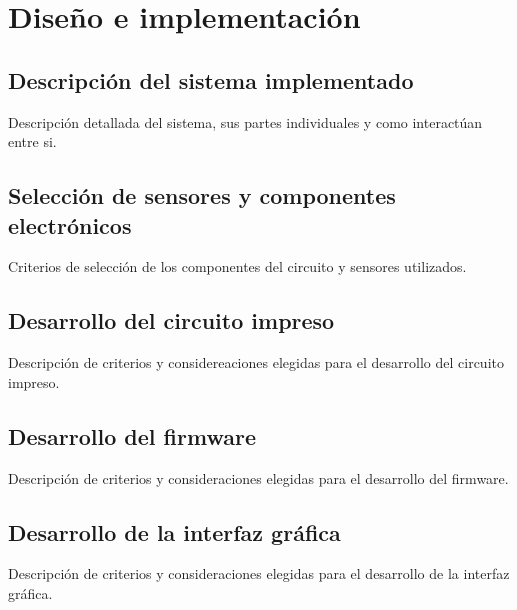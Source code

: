 \chapter{Diseño e implementación} %

\label{Chapter3}
\section{Descripción del sistema implementado}

Descripción detallada del sistema, sus partes individuales y como interactúan entre si.

\section{Selección de sensores y componentes electrónicos}

Criterios de selección de los componentes del circuito y sensores utilizados.

\section{Desarrollo del circuito impreso}

Descripción de criterios y considereaciones elegidas para el desarrollo del circuito impreso.

\section{Desarrollo del firmware}

Descripción de criterios y consideraciones elegidas para el desarrollo del firmware.

\section{Desarrollo de la interfaz gráfica}

Descripción de criterios y consideraciones elegidas para el desarrollo de la interfaz gráfica.

